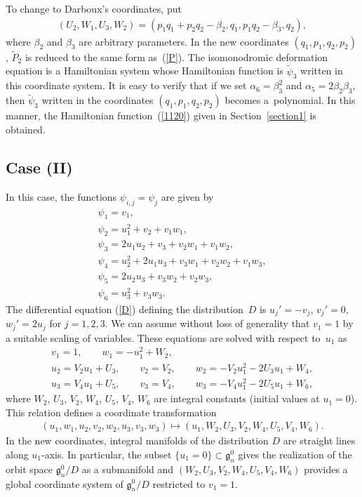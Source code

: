 \documentclass[10pt,a4paper]{amsart}
\numberwithin{equation}{section}
\begin{document}
To change to Darboux's coordinates, put
\begin{gather*}
(U_2, W_1, U_3, W_2) = (p_1q_1 + p_2q_2 - \beta_2, q_1, p_1q_2-\beta_3, q_2),
\end{gather*}
where $\beta_2$ and $\beta_3$ are arbitrary parameters. In the new coordinates $(q_1, p_1,q_2,p_2)$, $\widetilde{P}_2$ is reduced to the same form as~(\ref{P}). The isomonodromic deformation equation is a Hamiltonian system whose Hamiltonian function is $\widetilde{\psi}_3$ written in this coordinate system. It is easy to verify that if we set $\alpha _6 = \beta_3^2$ and $\alpha _5 = 2\beta_2\beta_3$, then $\widetilde{\psi}_3$ written in the coordinates $(q_1, p_1,q_2,p_2)$ becomes a~polynomial. In this manner, the Hamiltonian function~(\ref{1120}) given in Section~\ref{section1} is obtained.

\subsection{Case (II)}\label{section4.2}

In this case, the functions $\psi _{i,j} = \psi _j$ are given by
\begin{gather*}
\psi _1 = v_1, \\
\psi _2 = u_1^2 + v_2 + v_1w_1, \\
\psi _3 = 2u_1u_2 + v_3 + v_2w_1 + v_1w_2, \\
\psi _4 = u_2^2 + 2u_1u_3 + v_3w_1 + v_2w_2 + v_1w_3, \\
\psi_5 = 2u_2u_3 + v_3w_2 + v_2w_3, \\
\psi_6 = u_3^2 + v_3w_3.
\end{gather*}
The dif\/ferential equation (\ref{D}) def\/ining the distribution~$D$ is $u_j' = -v_j$, $v_j' = 0$, $w_j' = 2u_j$ for $j=1,2,3$. We can assume without loss of generality that $v_1 = 1$ by a suitable scaling of variables. These equations are solved with respect to~$u_1$ as
\begin{gather*}
v_1 = 1,\qquad w_1 = -u_1^2 + W_2,\\
u_2 = V_2 u_1 + U_3,\qquad v_2 = V_2, \qquad w_2 = -V_2u_1^2-2U_3u_1+W_4, \\
u_3 = V_4 u_1 + U_5,\qquad v_3 = V_4,\qquad w_3 = -V_4u_1^2 - 2U_5u_1 + W_6,
\end{gather*}
where $W_2$, $U_3$, $V_2$, $W_4$, $U_5$, $V_4$, $W_6$ are integral constants (initial values at $u_1 = 0$). This relation def\/ines a coordinate transformation
\begin{gather*}
(u_1, w_1, u_2, v_2, w_2, u_3, v_3, w_3) \mapsto (u_1, W_2, U_3, V_2, W_4, U_5, V_4, W_6).
\end{gather*}
In the new coordinates, integral manifolds of the distribution $D$ are straight lines along $u_1$-axis. In particular, the subset $\{ u_1 = 0\} \subset \mathfrak{g}^0_n$ gives the realization of the orbit space $\mathfrak{g}^0_n/D$ as a submanifold and $( W_2, U_3, V_2, W_4, U_5, V_4, W_6)$ provides a global coordinate system of $\mathfrak{g}^0_n/D$ restricted to $v_1 = 1$.
\end{document}
